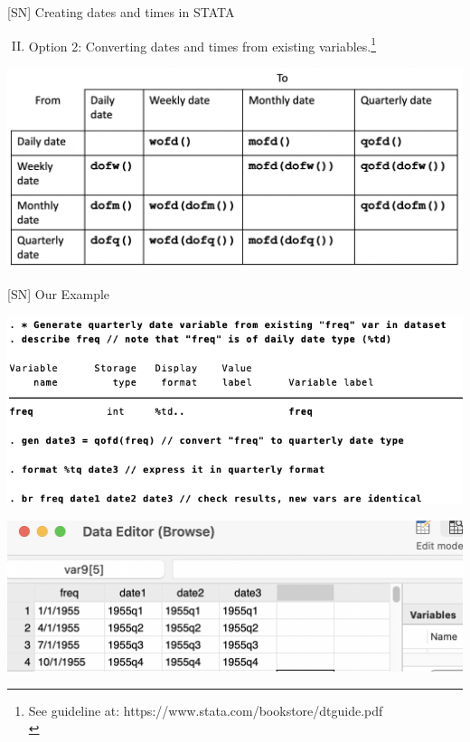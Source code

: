 \documentclass[
  10pt,
  ignorenonframetext,
]{beamer}
\providecommand{\tightlist}{%
  \setlength{\itemsep}{0pt}\setlength{\parskip}{0pt}}
\begin{document}
\begin{frame}{{[}SN{]} Creating dates and times in STATA}
\protect\hypertarget{sn-creating-dates-and-times-in-stata-1}{}
\begin{enumerate}
[(I)]
\setcounter{enumi}{1}
\tightlist
\item
  Option 2: Converting dates and times from existing
  variables.\footnote[frame]{See guideline at: https://www.stata.com/bookstore/dtguide.pdf \\}
\end{enumerate}

\begin{center}\includegraphics[width=0.9\linewidth]{pictures/ConvertingDates} \end{center}
\end{frame}

\begin{frame}{{[}SN{]} Our Example}
\protect\hypertarget{sn-our-example-2}{}
\begin{flushleft}\includegraphics[width=0.9\linewidth]{pictures/S2-GenDate-Opt2} \end{flushleft}

\begin{center}\includegraphics[width=0.7\linewidth]{pictures/S2-GenDate-Compare} \end{center}
\end{frame}
\end{document}
